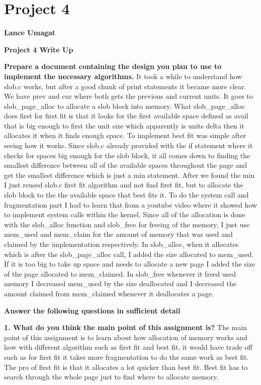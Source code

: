 \documentclass[letterpaper,10pt,titlepage,fleqn]{article}
\begin{document}
\section*{Project 4}

\textbf{Lance Umagat}

\textbf{Project 4 Write Up}

\textbf{Prepare a document containing the design you plan to use to implement the necessary algorithms.}
	It took a while to understand how slob.c works, but after a good chunk of print statements it became more clear. We have prev and cur where both gets the previous and current units. It goes to slob\_page\_alloc to allocate a slob block into memory. What slob\_page\_alloc does first for first fit is that it looks for the first available space defined as avail that is big enough to first the unit size which apparently is units \+ delta then it allocates it when it finds enough space. To implement best fit was simple after seeing how it works. Since slob.c already provided with the if statement where it checks for spaces big enough for the slob block, it all comes down to finding the smallest difference between all of the available spaces throughout the page and get the smallest difference which is just a min statement. After we found the min I just reused slob.c first fit algorithm and not find first fit, but to allocate the slob block to the the available space that best fits it. To do the system call and fragmentation part I had to learn that from a youtube video where it showed how to implement system calls within the kernel. Since all of the allocation is done with the slob\_alloc function and  slob\_free for freeing of the memory, I just use mem\_used and mem\_claim for the amount of memory that was used and claimed by the implementation respectively. In slob\_alloc, when it allocates which is after the slob_page_alloc call, I added the size allocated to mem\_used. If it is too big to take up space and needs to allocate a new page I added the size of the page allocated to mem\_claimed. In slob\_free whenever it freed used memory I decreased mem\_used by the size deallocated and I decreased the amount claimed from mem\_claimed whenever it deallocates a page.

\textbf{Answer the following questions in sufficient detail}

    \textbf{1. What do you think the main point of this assignment is?}
    The main point of this assignment is to learn about how allocation of memory works and how with different algorithm such as first fit and best fit, it would have trade off such as for first fit it takes more fragmentation to do the same work as best fit. The pro of first fit is that it allocates a lot quicker than best fit. Best fit has to search through the whole page just to find where to allocate memory. 
\end{document}
